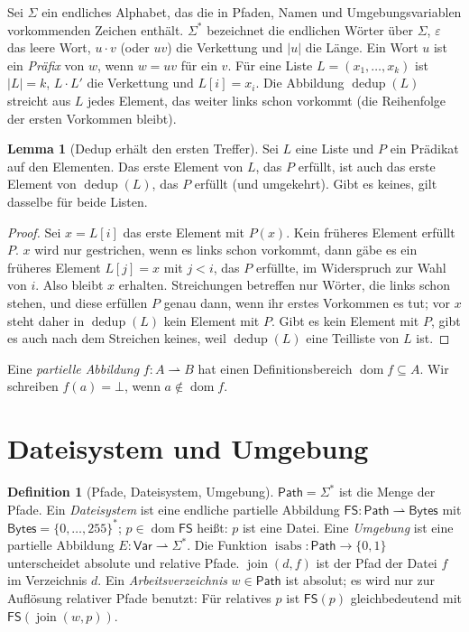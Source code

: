 \documentclass[a4paper,12pt,twoside]{report}
\DeclareRobustCommand{\_}{\ifmmode\mbox{\textunderscore}\else\textunderscore\allowbreak{}\fi}
\theoremstyle{definition}
\newtheorem{definition}{Definition}[chapter]
\newtheorem{lemma}{Lemma}[chapter]
\newcommand{\Path}{\mathsf{Path}}
\newcommand{\Bytes}{\mathsf{Bytes}}
\newcommand{\FS}{\mathsf{FS}}
\newcommand{\dom}{\operatorname{dom}}
\begin{document}
Sei $\Sigma$ ein endliches Alphabet, das die in Pfaden, Namen und Umgebungsvariablen vorkommenden Zeichen enthält. $\Sigma^*$ bezeichnet die endlichen Wörter über $\Sigma$, $\varepsilon$ das leere Wort, $u\cdot v$ (oder $uv$) die Verkettung und $|u|$ die Länge. Ein Wort $u$ ist ein \emph{Präfix} von $w$, wenn $w=uv$ für ein $v$. Für eine Liste $L=(x_1,\ldots,x_k)$ ist $|L|=k$, $L\cdot L'$ die Verkettung und $L[i]=x_i$. Die Abbildung $\operatorname{dedup}(L)$ streicht aus $L$ jedes Element, das weiter links schon vorkommt (die Reihenfolge der ersten Vorkommen bleibt).

\begin{lemma}[Dedup erhält den ersten Treffer]
	\label{lem:dedup}
	Sei $L$ eine Liste und $P$ ein Prädikat auf den Elementen. Das erste Element von $L$, das $P$ erfüllt, ist auch das erste Element von $\operatorname{dedup}(L)$, das $P$ erfüllt (und umgekehrt). Gibt es keines, gilt dasselbe für beide Listen.
\end{lemma}

\begin{proof}
	Sei $x=L[i]$ das erste Element mit $P(x)$. Kein früheres Element erfüllt $P$. $x$ wird nur gestrichen, wenn es links schon vorkommt, dann gäbe es ein früheres Element $L[j]=x$ mit $j<i$, das $P$ erfüllte, im Widerspruch zur Wahl von $i$. Also bleibt $x$ erhalten. Streichungen betreffen nur Wörter, die links schon stehen, und diese erfüllen $P$ genau dann, wenn ihr erstes Vorkommen es tut; vor $x$ steht daher in $\operatorname{dedup}(L)$ kein Element mit $P$. Gibt es kein Element mit $P$, gibt es auch nach dem Streichen keines, weil $\operatorname{dedup}(L)$ eine Teilliste von $L$ ist.
\end{proof}

Eine \emph{partielle Abbildung} $f:A\rightharpoonup B$ hat einen Definitionsbereich $\dom f\subseteq A$. Wir schreiben $f(a)=\bot$, wenn $a\notin\dom f$.

\section{Dateisystem und Umgebung}

\begin{definition}[Pfade, Dateisystem, Umgebung]
	\label{def:fs}
	$\Path=\Sigma^*$ ist die Menge der Pfade. Ein \emph{Dateisystem} ist eine endliche partielle Abbildung $\FS:\Path\rightharpoonup\Bytes$ mit $\Bytes=\{0,\ldots,255\}^*$; $p\in\dom\FS$ heißt: $p$ ist eine Datei. Eine \emph{Umgebung} ist eine partielle Abbildung $E:\mathsf{Var}\rightharpoonup\Sigma^*$. Die Funktion $\operatorname{isabs}:\Path\to\{0,1\}$ unterscheidet absolute und relative Pfade. $\operatorname{join}(d,f)$ ist der Pfad der Datei $f$ im Verzeichnis $d$. Ein \emph{Arbeitsverzeichnis} $w\in\Path$ ist absolut; es wird nur zur Auflösung relativer Pfade benutzt: Für relatives $p$ ist $\FS(p)$ gleichbedeutend mit $\FS(\operatorname{join}(w,p))$.
\end{definition}
\end{document}

